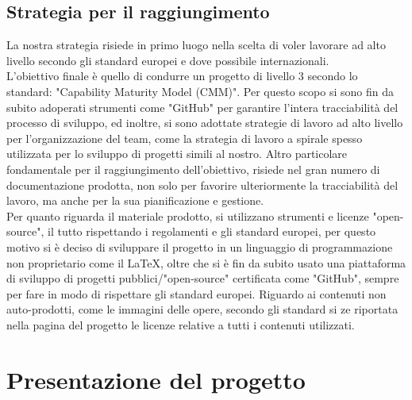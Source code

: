 \documentclass[hidelinks,12pt,a4paper]{article}
\begin{document}
\begin{flushleft}
			\subsection{Strategia per il raggiungimento}
			La nostra strategia risiede in primo luogo nella scelta di voler lavorare ad alto livello secondo gli standard europei e dove possibile internazionali.\\
			L'obiettivo finale è quello di condurre un progetto di livello 3 secondo lo standard: "Capability Maturity Model (CMM)". Per questo scopo si sono fin da subito adoperati strumenti come "GitHub" per garantire l'intera tracciabilità del processo di sviluppo, ed inoltre, si sono adottate strategie di lavoro ad alto livello per l'organizzazione del team, come la strategia di lavoro a spirale spesso utilizzata per lo sviluppo di progetti simili al nostro. Altro particolare fondamentale per il raggiungimento dell'obiettivo, risiede nel gran numero di documentazione prodotta, non solo per favorire ulteriormente la tracciabilità del lavoro, ma anche per la sua pianificazione e gestione.\\
			Per quanto riguarda il materiale prodotto, si utilizzano strumenti e licenze "open-source", il tutto rispettando i regolamenti e gli standard europei, per questo motivo si è deciso di sviluppare il progetto in un linguaggio di programmazione non proprietario come il \LaTeX, oltre che si è fin da subito usato una piattaforma di sviluppo di progetti pubblici/"open-source" certificata come "GitHub", sempre per fare in modo di rispettare gli standard europei. Riguardo ai contenuti non auto-prodotti, come le immagini delle opere, secondo gli standard si ze riportata nella pagina del progetto le licenze relative a tutti i contenuti utilizzati.
		
		\section{Presentazione del progetto}

\end{flushleft}
\end{document}
